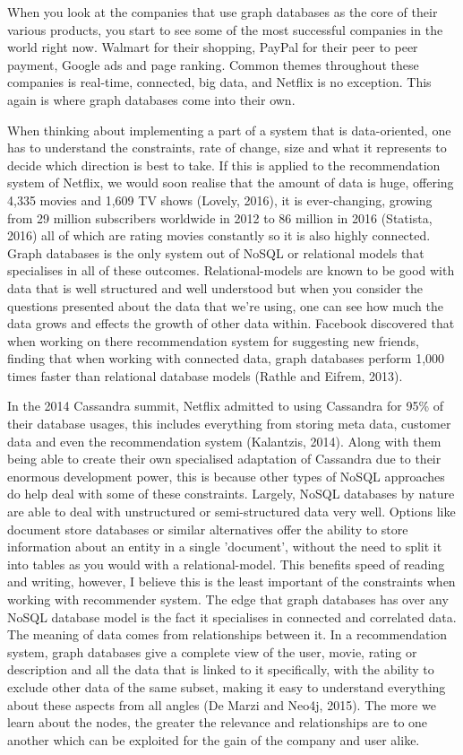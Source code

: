\documentclass[a4paper]{article}
\begin{document}
When you look at the companies that use graph databases as the core of their various products, you start to see some of the most successful companies in the world right now. Walmart for their shopping, PayPal for their peer to peer payment, Google ads and page ranking. Common themes throughout these companies is real-time, connected, big data, and Netflix is no exception. This again is where graph databases come into their own.

When thinking about implementing a part of a system that is data-oriented, one has to understand the constraints, rate of change, size and what it represents to decide which direction is best to take. If this is applied to the recommendation system of Netflix, we would soon realise that the amount of data is huge, offering 4,335 movies and 1,609 TV shows (Lovely, 2016), it is ever-changing, growing from 29 million subscribers worldwide in 2012 to 86 million in 2016 (Statista, 2016) all of which are rating movies constantly so it is also highly connected. Graph databases is the only system out of NoSQL or relational models that specialises in all of these outcomes. Relational-models are known to be good with data that is well structured and well understood but when you consider the questions presented about the data that we're using, one can see how much the data grows and effects the growth of other data within. Facebook discovered that when working on there recommendation system for suggesting new friends, finding that when working with connected data, graph databases perform 1,000 times faster than relational database models (Rathle and Eifrem, 2013).

In the 2014 Cassandra summit, Netflix admitted to using Cassandra for 95\% of their database usages, this includes everything from storing meta data, customer data and even the recommendation system (Kalantzis, 2014). Along with them being able to create their own specialised adaptation of Cassandra due to their enormous development power, this is because other types of NoSQL approaches do help deal with some of these constraints. Largely, NoSQL databases by nature are able to deal with unstructured or semi-structured data very well. Options like document store databases or similar alternatives offer the ability to store information about an entity in a single 'document', without the need to split it into tables as you would with a relational-model. This benefits speed of reading and writing, however, I believe this is the least important of the constraints when working with recommender system. The edge that graph databases has over any NoSQL database model is the fact it specialises in connected and correlated data. The meaning of data comes from relationships between it. In a recommendation system, graph databases give a complete view of the user, movie, rating or description and all the data that is linked to it specifically, with the ability to exclude other data of the same subset, making it easy to understand everything about these aspects from all angles (De Marzi and Neo4j, 2015). The more we learn about the nodes, the greater the relevance and relationships are to one another which can be exploited for the gain of the company and user alike. \par
\end{document}

